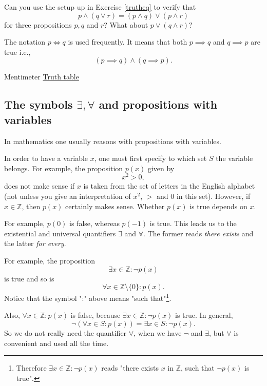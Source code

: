 \begin{exercise}\label{logictt}
  Can you use the setup up in Exercise \ref{trutheq} to verify that
  $$
    p\land (q \lor r) = (p\land q) \lor (p \land r)
  $$
  for three propositions $p, q$ and $r$? What about
  $
    p\lor (q \land r)?
  $
\end{exercise}

The notation $p \iff q$ is used frequently. It means that both
$p\implies q$ and $q\implies p$ are true i.e.,
$$
  (p\implies q) \land (q\implies p).
$$






\begin{button}{Mentimeter}
  \href{https://www.mentimeter.com/s/0b00e8b235b0b0d8b0ceef16a04f1b32/9ff91d7f48c9}{Truth table}
\end{button}

\subsection{The symbols $\exists, \forall$ and propositions with variables}

In mathematics one usually reasons with propositions with variables.

In order to have a variable $x$, one must first specify to which set
$S$ the variable belongs. For example, the proposition $p(x)$ given by
$$
  x^2 > 0,
$$
does not make sense if $x$ is taken from the set of letters in the
English alphabet (not unless you give an interpretation of $x^2$,
$>$ and $0$ in this set). However, if $x\in \mathbb{Z}$, then $p(x)$
certainly makes sense. Whether $p(x)$ is true depends on $x$.

For example, $p(0)$ is false, whereas $p(-1)$ is true. This leads us to
the existential and universal quantifiers $\exists$ and $\forall$.
The former reads \emph{there exists} and the latter \emph{for every}.

For example, the proposition
$$
  \exists x\in \mathbb{Z}: \neg p(x)
$$
is true and so is
$$
  \forall x\in \mathbb{Z}\setminus\{0\}: p(x).
$$
Notice that the  symbol ":" above means "such that"\footnote{Therefore
  $\exists x\in \mathbb{Z}: \neg p(x)$ reads "there exists $x$ in $\mathbb{Z}$, such that
  $\neg p(x)$ is true".}.

Also, $\forall x\in \mathbb{Z}: p(x)$ is false, because
$\exists x\in \mathbb{Z}: \neg p(x)$ is true. In general,
$$
  \neg\left(\forall x\in S: p(x)\right) = \exists x\in S: \neg p(x).
$$
So we do not really need the quantifier $\forall$, when we have
$\neg$ and $\exists$, but $\forall$ is convenient and used all
the time.

